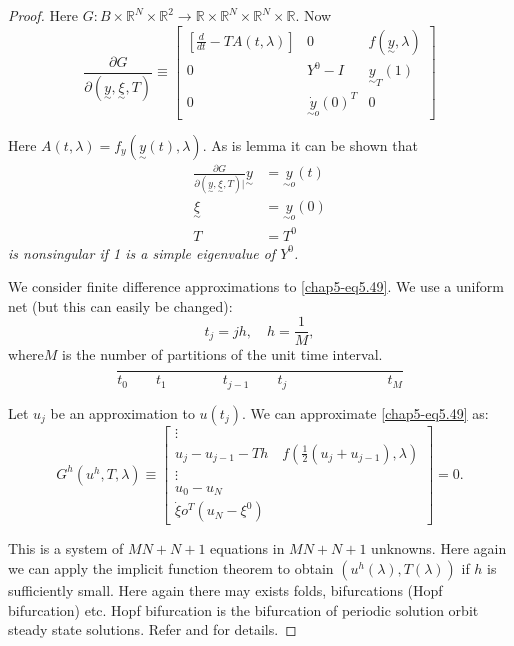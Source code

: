 \begin{proof}
  Here $G:B \times \mathbb{R}^N \times \mathbb{R}^2 \to \mathbb{R}
  \times \mathbb{R}^N \times \mathbb{R}^N \times \mathbb{R}$. Now 
$$ 
\frac{\partial G}{\partial (\underset{\sim}{y},\underset{\sim}{\xi},
  T)} \equiv 
\begin{bmatrix}
 \left[\frac{d}{dt}- TA(t, \lambda ) \right] & 0 &
  f(\underset{\sim}{y}, \lambda) \\
 0 & Y^0-I & \underset{\sim}{y}_T(1) \\
 0 & \underset{\sim o}{\dot{y}}(0)^T & 0  
\end{bmatrix} 
$$ 

   Here $A(t, \lambda )= f_y(\underset{\sim}{y}(t), \lambda )$. As is
   lemma it can be shown that  
 \begin{align*}
 \frac{\partial
   G}{\partial(\underset{\sim}{y},\underset{\sim}{\xi},T)|}
   \underset{\sim}{y} & =\underset{\sim o}{y} (t)  \\ 
\underset{\sim}{\xi}&= \underset{\sim o}{y}(0) \\ 
T & = T^0 
 \end{align*}
 {\em is nonsingular if 1 is a simple eigenvalue of $Y^0$.}
 
 We consider finite difference approximations to
 \eqref{chap5-eq5.49}. We use a uniform net (but this can easily be changed): 
 $$
 t_j= jh, \quad h= \frac{1}{M}, 
 $$
 where\pageoriginale $M$ is the number of partitions of the unit time
 interval.  
 $$
\frac{}{t_0 \qquad  t_1 \qquad \qquad t_{j-1} \qquad  t_j \hspace{3cm}
  t_M} 
$$

Let $u_j$ be an approximation to $u(t_j)$. We can approximate
\eqref{chap5-eq5.49} as: 
$$
G^h(u^h,T,\lambda ) \equiv
\begin{bmatrix}
\vdots \\ 
u_j-u_{j-1}-Th \quad  f \left( \frac{1}{2} (u_j+u_{j-1}), \lambda \right)\\ 
\vdots \\
 u_0-u_N \\ \dot{\xi}o^T(u_N- \xi^0)
\end{bmatrix}
=0.
$$

This is a system of $MN+N+1$ equations in $MN+N+1$ unknowns. Here
again we can apply the implicit function theorem to obtain
$(u^h(\lambda), T(\lambda))$ if $h$ is sufficiently small. Here again
there may exists folds, bifurcations (Hopf bifurcation) etc. Hopf
bifurcation is the bifurcation of periodic solution orbit steady state
solutions. Refer \cite{key14} and \cite{key10} for details. 


\end{proof}
